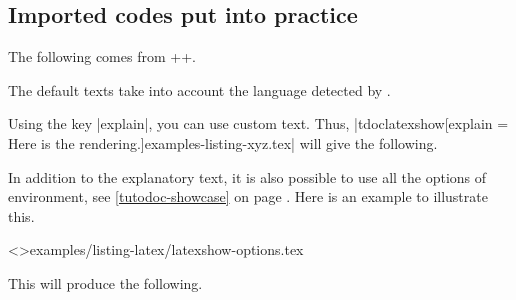 

\subsection{Imported codes put into practice}
\label{tutodoc-listing-latexshow}

\begin{tdocexa}[Showcase]
    The following comes from \tdoclatexin++.

    \medskip

    \begin{tdocshowcaseDOC}

    \end{tdocshowcaseDOC}
\end{tdocexa}


\begin{tdocnote}
    The default texts take into account the language detected by \thisproj.
\end{tdocnote}




\begin{tdocexa}
    Using the key \tdoclatexin|explain|, you can use custom text. Thus, \tdoclatexin|tdoclatexshow[explain = Here is the rendering.]{examples-listing-xyz.tex}| will give the following.

    \medskip

    \begin{tdocshowcaseDOC}

    \end{tdocshowcaseDOC}
\end{tdocexa}




\begin{tdocexa}
    In addition to the explanatory text, it is also possible to use all the options of  environment, see \ref{tutodoc-showcase} on page \pageref{tutodoc-showcase}.
    Here is an example to illustrate this.

    \medskip

    \tdoclatexinput<>{examples/listing-latex/latexshow-options.tex}

    \medskip

    This will produce the following.

    \medskip

    \begin{tdocshowcaseDOC}
        

    \end{tdocshowcaseDOC}
\end{tdocexa}


